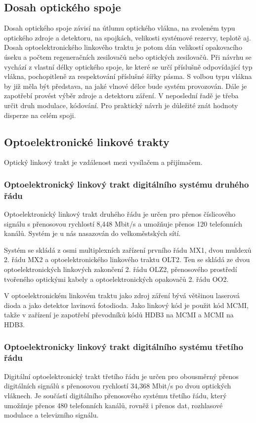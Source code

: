 \subsection{Dosah optického spoje}
Dosah optického spoje závisí na útlumu optického vlákna, na zvoleném typu optického zdroje a detektoru, na spojkách, velikosti systémové rezervy, teplotě aj. Dosah optoelektronického linkového traktu je potom dán velikostí opakovacího úseku a počtem regeneračních zesilovačů nebo optických zesilovačů. Při návrhu se vychází z vlastní délky optického spoje, ke které se určí příslušně odpovídající typ vlákna, pochopitleně za respektování příslušné šířky pásma. S volbou typu vlákna by již měla být představa, na jaké vlnové délce bude systém provozován. Dále je zapotřebí provést výběr zdroje a detektoru záření. V neposlední řadě je třeba určit druh modulace, kódování. Pro praktický návrh je důležité znát hodnoty disperze na celém spoji.

\subsection{Optoelektronické linkové trakty}
Optický linkový trakt je vzdálenost mezi vysílačem a přijímačem.

\subsubsection{Optoelektronický linkový trakt digitálního systému druhého řádu}
Optoelektronický linkový trakt druhého řádu je určen pro přenos číslicového signálu s přenosovou rychlostí 8,448 Mbit/s a umožňuje přenos 120 telefonních kanálů. Systém je u nás nasazován do velkoměstských sítí.

Systém se skládá z osmi multiplexních zařízení prvního řádu MX1, dvou muldexů 2. řádu MX2 a optoelektronického linkového traktu OLT2. Ten se skládá ze dvou optoelektronických linkových zakončení 2. řádu OLZ2, přenosového prostředí tvořeného optickými kabely a optoelektronických opakovačů 2. řádu OO2.

V optoelektronickém linkovém traktu jako zdroj záření bývá většinou laserová dioda a jako detektor lavinová fotodioda. Jako linkový kód je použit kód MCMI, takže v zařízení je zapotřebí převodníků kódů HDB3 na MCMI a MCMI na HDB3.

\subsubsection{Optoelektronicky linkový trakt digitálního systému třetího řádu}
Digitální optoelektronický trakt třetího řádu je určen pro obousměrný přenos digitálních signálů s přenosovou rychlostí 34,368 Mbit/s po dvou optických vláknech. Je součástí digitálního přenosového systému třetího řádu, který umožňuje přenos 480 telefonních kanálů, rovněž i přenos dat, rozhlasové modulace a televizního signálu.


